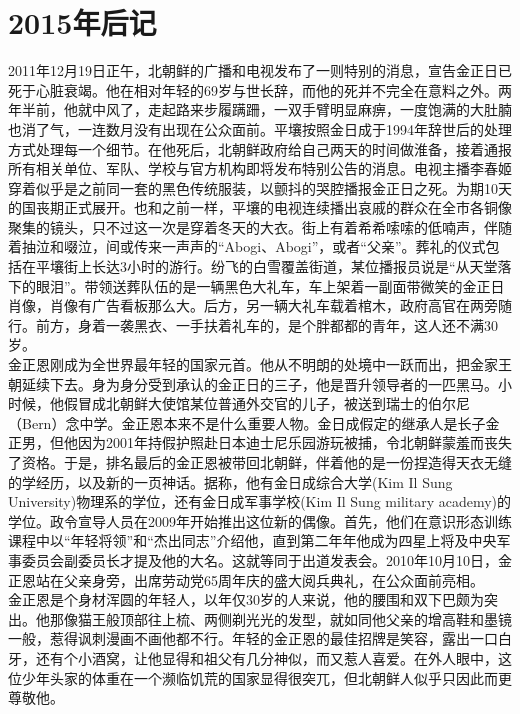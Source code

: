 \fancyhead[RO]{\thepage}
\fancyhead[LE]{\thepage}
\fancyfoot[LE,RO]{}
\fancyfoot[LO,CE]{}
\fancyfoot[CO,RE]{}
\chapter*{2015年后记}
2011年12月19日正午，北朝鲜的广播和电视发布了一则特别的消息，宣告金正日已死于心脏衰竭。他在相对年轻的69岁与世长辞，而他的死并不完全在意料之外。两年半前，他就中风了，走起路来步履蹒跚，一双手臂明显麻痹，一度饱满的大肚腩也消了气，一连数月没有出现在公众面前。平壤按照金日成于1994年辞世后的处理方式处理每一个细节。在他死后，北朝鲜政府给自己两天的时间做淮备，接着通报所有相关单位、军队、学校与官方机构即将发布特别公告的消息。电视主播李春姬穿着似乎是之前同一套的黑色传统服装，以颤抖的哭腔播报金正日之死。为期10天的国丧期正式展开。也和之前一样，平壤的电视连续播出哀戚的群众在全市各铜像聚集的镜头，只不过这一次是穿着冬天的大衣。街上有着希希嗦嗦的低喃声，伴随着抽泣和啜泣，间或传来一声声的“Abogi、Abogi”，或者“父亲”。葬礼的仪式包括在平壤街上长达3小时的游行。纷飞的白雪覆盖街道，某位播报员说是“从天堂落下的眼泪”。带领送葬队伍的是一辆黑色大礼车，车上架着一副面带微笑的金正日肖像，肖像有广告看板那么大。后方，另一辆大礼车载着棺木，政府高官在两旁随行。前方，身着一袭黑衣、一手扶着礼车的，是个胖都都的青年，这人还不满30岁。\\

金正恩刚成为全世界最年轻的国家元首。他从不明朗的处境中一跃而出，把金家王朝延续下去。身为身分受到承认的金正日的三子，他是晋升领导者的一匹黑马。小时候，他假冒成北朝鲜大使馆某位普通外交官的儿子，被送到瑞士的伯尔尼（Bern）念中学。金正恩本来不是什么重要人物。金日成假定的继承人是长子金正男，但他因为2001年持假护照赴日本迪士尼乐园游玩被捕，令北朝鲜蒙羞而丧失了资格。于是，排名最后的金正恩被带回北朝鲜，伴着他的是一份捏造得天衣无缝的学经历，以及新的一页神话。据称，他有金日成综合大学(Kim Il Sung University)物理系的学位，还有金日成军事学校(Kim Il Sung military academy)的学位。政令宣导人员在2009年开始推出这位新的偶像。首先，他们在意识形态训练课程中以“年轻将领”和“杰出同志”介绍他，直到第二年年他成为四星上将及中央军事委员会副委员长才提及他的大名。这就等同于出道发表会。2010年10月10日，金正恩站在父亲身旁，出席劳动党65周年庆的盛大阅兵典礼，在公众面前亮相。\\

金正恩是个身材浑圆的年轻人，以年仅30岁的人来说，他的腰围和双下巴颇为突出。他那像猫王般顶部往上梳、两侧剃光光的发型，就如同他父亲的增高鞋和墨镜一般，惹得讽刺漫画不画他都不行。年轻的金正恩的最佳招牌是笑容，露出一口白牙，还有个小酒窝，让他显得和祖父有几分神似，而又惹人喜爱。在外人眼中，这位少年头家的体重在一个濒临饥荒的国家显得很突兀，但北朝鲜人似乎只因此而更尊敬他。\\


